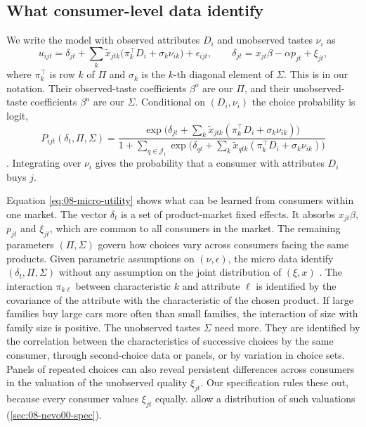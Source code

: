 \subsection{What consumer-level data identify}\label{sec:08-micro-what}

We write the model with observed attributes $D_i$ and unobserved tastes $\nu_i$ as
\begin{equation}\label{eq:08-micro-utility}
  u_{ijt} = \delta_{jt} + \sum_{k} \tilde x_{jtk}\big(\pi_k^\top D_i + \sigma_k \nu_{ik}\big) + \epsilon_{ijt},
  \qquad \delta_{jt} = x_{jt}\beta - \alpha p_{jt} + \xi_{jt},
\end{equation}
where $\pi_k^\top$ is row $k$ of $\Pi$ and $\sigma_k$ is the $k$-th diagonal element of $\Sigma$. This is
\citet[eqs.~3--4]{BerryLevinsohnPakes2004} in our notation. Their observed-taste coefficients $\beta^o$ are our $\Pi$,
and their unobserved-taste coefficients $\beta^u$ are our $\Sigma$. Conditional on $(D_i, \nu_i)$ the choice
probability is logit,
\begin{equation}\label{eq:08-micro-prob}
  P_{ijt}(\delta_t, \Pi, \Sigma) = \frac{\exp\big(\delta_{jt} + \sum_k \tilde x_{jtk}(\pi_k^\top D_i + \sigma_k\nu_{ik})\big)}
  {1 + \sum_{q \in \mathcal{J}_t}\exp\big(\delta_{qt} + \sum_k \tilde x_{qtk}(\pi_k^\top D_i + \sigma_k\nu_{ik})\big)}
\end{equation}
\citep[eq.~6]{BerryLevinsohnPakes2004}. Integrating over $\nu_i$ gives the probability that a consumer with attributes
$D_i$ buys $j$.

Equation \eqref{eq:08-micro-utility} shows what can be learned from consumers within one market. The vector
$\delta_t$ is a set of product-market fixed effects. It absorbs $x_{jt}\beta$, $p_{jt}$ and $\xi_{jt}$, which are common
to all consumers in the market. The remaining parameters $(\Pi, \Sigma)$ govern how choices vary across consumers
facing the same products. Given parametric assumptions on $(\nu, \epsilon)$, the micro data identify
$(\delta_t, \Pi, \Sigma)$ without any assumption on the joint distribution of $(\xi, x)$
\citep[pp.~72--73]{BerryLevinsohnPakes2004}. The interaction $\pi_{k\ell}$ between characteristic $k$ and attribute
$\ell$ is identified by the covariance of the attribute with the characteristic of the chosen product. If large
families buy large cars more often than small families, the interaction of size with family size is positive. The
unobserved tastes $\Sigma$ need more. They are identified by the correlation between the characteristics of
successive choices by the same consumer, through second-choice data or panels, or by variation in choice sets.
Panels of repeated choices can also reveal persistent differences across consumers in the valuation of the
unobserved quality $\xi_{jt}$. Our specification rules these out, because every consumer values $\xi_{jt}$ equally.
\citet{DasOlleyPakes1994} allow a distribution of such valuations (\cref{sec:08-nevo00-spec}).

